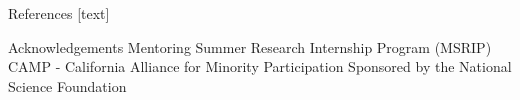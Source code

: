 \documentclass[final]{beamer}
\begin{document}
\begin{frame}[fragile]
\begin{columns}[t]
\begin{column}{0.31\linewidth}
\begin{minipage}[t][.955\textheight]{\linewidth}
\begin{block}{References}
\footnotesize
{}[text]
\vspace{-1ex}

\normalsize
\vfill
\end{block} 
\vfill

\vspace{0ex}
\begin{block}{Acknowledgements}
\vspace{0ex}
\normalsize
\center Mentoring Summer Research Internship Program (MSRIP)
\center CAMP - California Alliance for Minority Participation
\center Sponsored by the National Science Foundation
\vspace{0ex}
\vfill
\end{block} 
\vfill

\end{minipage}
\end{column}%

\end{columns}
\end{frame}
\end{document}
